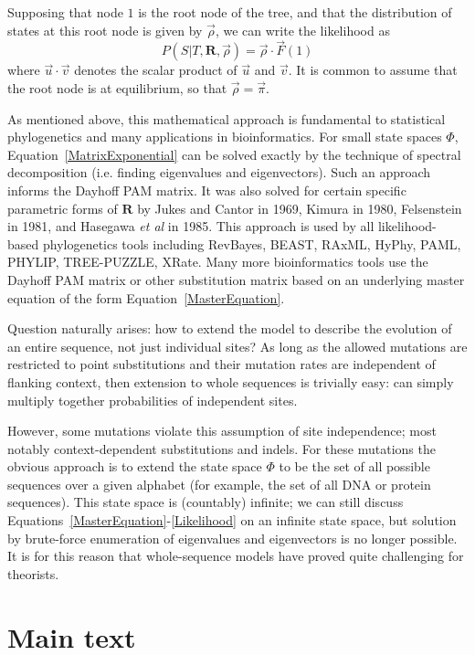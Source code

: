 \documentclass{bmcart}
\newcommand{\matr}[1]{\mathbf{#1}}
\newcommand{\eqref}[1]{Equation~\ref{#1}}
\begin{document}
Supposing that node $1$ is the root node of the tree,
and that the distribution of states at this root node is given by $\vec{\rho}$,
we can write the likelihood as
\begin{equation}
P(S|T,\matr{R},\vec{\rho}) = \vec{\rho} \cdot \vec{F}(1)
\label{Likelihood}
\end{equation}
where $\vec{u} \cdot \vec{v}$ denotes the scalar product of $\vec{u}$ and $\vec{v}$.
It is common to assume that the root node is at equilibrium,
so that $\vec{\rho} = \vec{\pi}$.

As mentioned above, this mathematical approach is fundamental to statistical phylogenetics
and many applications in bioinformatics.
For small state spaces $\Phi$, \eqref{MatrixExponential} can be solved exactly
by the technique of spectral decomposition (i.e. finding eigenvalues and eigenvectors).
Such an approach informs the Dayhoff PAM matrix.
It was also solved for certain specific parametric forms of $\matr{R}$
by Jukes and Cantor in 1969, Kimura in 1980, Felsenstein in 1981, and Hasegawa {\em et al} in 1985.
This approach is used by all likelihood-based phylogenetics tools including
RevBayes, BEAST, RAxML, HyPhy, PAML, PHYLIP, TREE-PUZZLE, XRate.
Many more bioinformatics tools use the Dayhoff PAM matrix or other substitution matrix
based on an underlying master equation of the form \eqref{MasterEquation}.

Question naturally arises: how to extend the model to describe the evolution of an entire sequence,
not just individual sites?
As long as the allowed mutations are restricted to point substitutions
and their mutation rates are independent of flanking context,
then extension to whole sequences is trivially easy:
can simply multiply together probabilities of independent sites.

However, some mutations violate this assumption of site independence;
most notably context-dependent substitutions and indels.
For these mutations the obvious approach is to extend the state space $\Phi$
to be the set of all possible sequences over a given alphabet
(for example, the set of all DNA or protein sequences).
This state space is (countably) infinite;
we can still discuss Equations~\ref{MasterEquation}-\ref{Likelihood}
on an infinite state space,
but solution by brute-force enumeration of eigenvalues and eigenvectors is no longer possible.
It is for this reason that whole-sequence models have proved quite challenging for theorists.

\section*{Main text}
\end{document}
